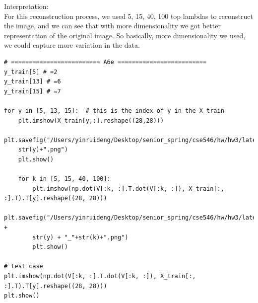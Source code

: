 \documentclass{article}
\begin{document}
Interpretation: \\
For this reconstruction process, we used 5, 15, 40, 100 top lambdas to reconstruct the image, and we can see that with more dimensionality we got better representation of the original image. So basically, more dimensionality we used, we could capture more variation in the data.







\begin{verbatim}
# ========================= A6e =========================
y_train[5] # =2
y_train[13] # =6
y_train[15] # =7

for y in [5, 13, 15]:  # this is the index of y in the X_train
	plt.imshow(X_train[y,:].reshape((28,28)))
	plt.savefig("/Users/yinruideng/Desktop/senior_spring/cse546/hw/hw3/latex/plots/A6e/A6e_"+
	str(y)+".png")
	plt.show()
	
	for k in [5, 15, 40, 100]:
		plt.imshow(np.dot(V[:k, :].T.dot(V[:k, :]), X_train[:, :].T).T[y].reshape((28, 28)))
		plt.savefig("/Users/yinruideng/Desktop/senior_spring/cse546/hw/hw3/latex/plots/A6e/A6e_" + 
		str(y) + "_"+str(k)+".png")
		plt.show()

# test case
plt.imshow(np.dot(V[:k, :].T.dot(V[:k, :]), X_train[:, :].T).T[y].reshape((28, 28)))
plt.show()
\end{verbatim}
\end{document}
